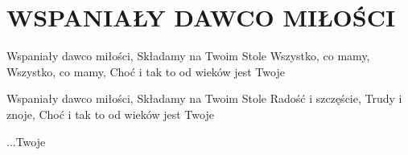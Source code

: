 \documentclass[../../../songbook.tex]{subfiles}
\begin{document}
\TabPositions{8cm} %
\section*{WSPANIAŁY DAWCO MIŁOŚCI}
{}
\vspace{0.5cm}
Wspaniały dawco miłości,			 \newline
Składamy na Twoim Stole			 \newline
Wszystko, co mamy,				  \newline
Wszystko, co mamy,				  \newline
Choć i tak to od wieków jest Twoje	  \newline

Wspaniały dawco miłości, \newline
Składamy na Twoim Stole \newline
Radość i szczęście, \newline
Trudy i znoje, \newline
Choć i tak to od wieków jest Twoje \newline

...Twoje		 \newline
\end{document}
